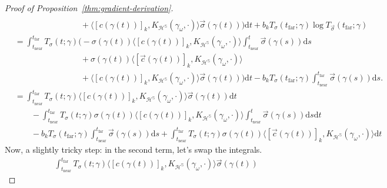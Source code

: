 \documentclass{article}
\newcommand{\dif}{\mathrm{d}}
\newcommand{\near}{\mathrm{near}}
\newcommand{\far}{\mathrm{far}}
\begin{document}
\begin{proof}[Proof of Proposition~\ref{thm:gradient-derivation}]
{\begin{align*}
                    \\ &\qquad\qquad\qquad\qquad
                    + \langle [c(\gamma(t))]_k, K_{\mathcal{H}^\mathbb{S}}(\gamma_\omega, \cdot) \rangle \vec{\sigma}(\gamma(t))
                \biggr)
                \dif t
            + b_k T_{\sigma}(t_\far;\gamma) \log T_{\vec{\sigma}}(t_\far;\gamma)
        \\ &=
            \int_{t_\near}^{t_\far}
                T_{\sigma}(t;\gamma)
                \biggl(
                    -\sigma(\gamma(t))
                    \langle [c(\gamma(t))]_k, K_{\mathcal{H}^\mathbb{S}}(\gamma_\omega, \cdot) \rangle
                    \int_{t_\near}^t \vec{\sigma}(\gamma(s)) \dif s
                    \\ &\qquad\qquad\qquad\qquad
                    + \sigma(\gamma(t)) \langle [\vec{c}(\gamma(t))]_k, K_{\mathcal{H}^\mathbb{S}}(\gamma_\omega, \cdot) \rangle
                    \\ &\qquad\qquad\qquad\qquad
                    + \langle [c(\gamma(t))]_k, K_{\mathcal{H}^\mathbb{S}}(\gamma_\omega, \cdot) \rangle \vec{\sigma}(\gamma(t))
                \biggr)
                \dif t
            - b_k T_{\sigma}(t_\far;\gamma) \int_{t_\near}^{t_\far} \vec{\sigma}(\gamma(s)) \dif s.
        \\ &=
            \int_{t_\near}^{t_\far}
                T_{\sigma}(t;\gamma)
                \langle [c(\gamma(t))]_k, K_{\mathcal{H}^\mathbb{S}}(\gamma_\omega, \cdot) \rangle \vec{\sigma}(\gamma(t))
            \dif t
            \\ &\qquad - \int_{t_\near}^{t_\far}
                T_{\sigma}(t;\gamma)
                \sigma(\gamma(t))
                \langle [c(\gamma(t))]_k, K_{\mathcal{H}^\mathbb{S}}(\gamma_\omega, \cdot) \rangle
                \int_{t_\near}^t \vec{\sigma}(\gamma(s)) \dif s
            \dif t
            \\ &\qquad - b_k T_{\sigma}(t_\far;\gamma) \int_{t_\near}^{t_\far} \vec{\sigma}(\gamma(s)) \dif s
            + \int_{t_\near}^{t_\far}
                T_{\sigma}(t;\gamma)
                \sigma(\gamma(t)) \langle [\vec{c}(\gamma(t))]_k, K_{\mathcal{H}^\mathbb{S}}(\gamma_\omega, \cdot) \rangle
            \dif t
    \end{align*}
    }
    Now, a slightly tricky step: in the second term, let's swap the integrals.
    {\small
    \begin{align*}
        &
            \int_{t_\near}^{t_\far}
                T_{\sigma}(t;\gamma)
                \langle [c(\gamma(t))]_k, K_{\mathcal{H}^\mathbb{S}}(\gamma_\omega, \cdot) \rangle \vec{\sigma}(\gamma(t))

\end{align*}}
\end{proof}
\end{document}
